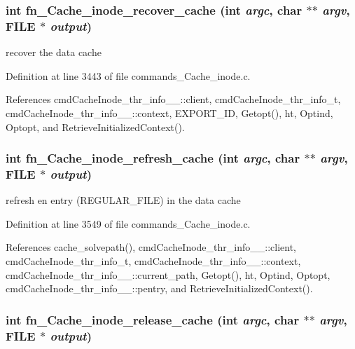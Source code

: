 \subsubsection{\setlength{\rightskip}{0pt plus 5cm}int fn\_\-Cache\_\-inode\_\-recover\_\-cache (int {\em argc}, char $\ast$$\ast$ {\em argv}, FILE $\ast$ {\em output})}\label{commands__Cache__inode_8c_a45}


recover the data cache 

Definition at line 3443 of file commands\_\-Cache\_\-inode.c.

References cmd\-Cache\-Inode\_\-thr\_\-info\_\-\_\-::client, cmd\-Cache\-Inode\_\-thr\_\-info\_\-t, cmd\-Cache\-Inode\_\-thr\_\-info\_\-\_\-::context, EXPORT\_\-ID, Getopt(), ht, Optind, Optopt, and Retrieve\-Initialized\-Context().
\subsubsection{\setlength{\rightskip}{0pt plus 5cm}int fn\_\-Cache\_\-inode\_\-refresh\_\-cache (int {\em argc}, char $\ast$$\ast$ {\em argv}, FILE $\ast$ {\em output})}\label{commands__Cache__inode_8c_a46}


refresh en entry (REGULAR\_\-FILE) in the data cache 

Definition at line 3549 of file commands\_\-Cache\_\-inode.c.

References cache\_\-solvepath(), cmd\-Cache\-Inode\_\-thr\_\-info\_\-\_\-::client, cmd\-Cache\-Inode\_\-thr\_\-info\_\-t, cmd\-Cache\-Inode\_\-thr\_\-info\_\-\_\-::context, cmd\-Cache\-Inode\_\-thr\_\-info\_\-\_\-::current\_\-path, Getopt(), ht, Optind, Optopt, cmd\-Cache\-Inode\_\-thr\_\-info\_\-\_\-::pentry, and Retrieve\-Initialized\-Context().
\subsubsection{\setlength{\rightskip}{0pt plus 5cm}int fn\_\-Cache\_\-inode\_\-release\_\-cache (int {\em argc}, char $\ast$$\ast$ {\em argv}, FILE $\ast$ {\em output})}\label{commands__Cache__inode_8c_a44}


